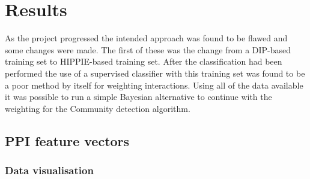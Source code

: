 \chapter{Results}
\label{results}


As the project progressed the intended approach was found to be flawed and some changes were made.
The first of these was the change from a DIP-based training set to HIPPIE-based training set.
After the classification had been performed the use of a supervised classifier with this training set was found to be a poor method by itself for weighting interactions.
Using all of the data available it was possible to run a simple Bayesian alternative to continue with the weighting for the Community detection algorithm.

\section{PPI feature vectors}









\subsection{Data visualisation}


